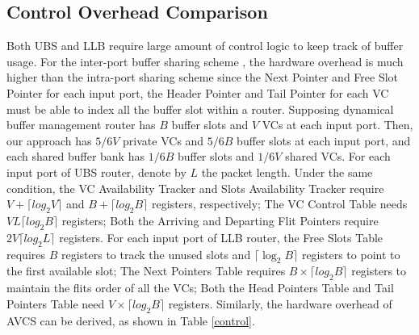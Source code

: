 \documentclass[10pt,conference]{IEEEtran}
\begin{document}
\subsection{Control Overhead Comparison}\label{controllogic}
Both UBS \cite{NPKV06}\cite{5770788} and LLB \cite{4555894}\cite{Neishaburi:2009:RAN:1531542.1531658} require large amount of control logic to keep track of buffer usage. For the inter-port buffer sharing scheme \cite{Neishaburi:2009:RAN:1531542.1531658}, the hardware overhead is much higher than the intra-port sharing scheme since the Next Pointer and Free Slot Pointer for each input port, the Header Pointer and Tail Pointer for each VC must be able to index all the buffer slot within a router. Supposing dynamical buffer management router \cite{NPKV06}\cite{4555894}\cite{Neishaburi:2009:RAN:1531542.1531658}\cite{5770788} has $B$ buffer slots and $V$ VCs at each input port. Then, our approach has $5/6V$ private VCs and $5/6B$ buffer slots at each input port, and each shared buffer bank has $1/6B$ buffer slots and $1/6V$ shared VCs. For each input port of UBS router, denote by $L$ the packet length. Under the same condition, the VC Availability Tracker and Slots Availability Tracker require $V+\lceil log_2 V\rceil$ and $B+\lceil log_2B\rceil$ registers, respectively; The VC Control Table needs $VL\lceil log_2B\rceil$ registers; Both the Arriving and Departing Flit Pointers require $2V\lceil log_2 L\rceil$ registers. For each input port of LLB router, the Free Slots Table requires $B$ registers to track the unused slots and $\lceil \log_2 B\rceil$ registers to point to the first available slot; The Next Pointers Table requires $B\times \lceil log_2 B\rceil$ registers to maintain the flits order of all the VCs; Both the Head Pointers Table and Tail Pointers Table need $V\times \lceil log_2 B\rceil$ registers. Similarly, the hardware overhead of AVCS can be derived, as shown in Table \ref{control}.

\end{document}
